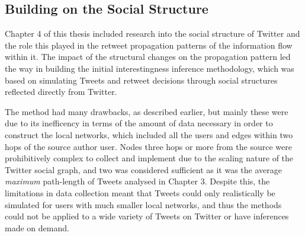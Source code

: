 


\subsection{Building on the Social Structure}
Chapter 4 of this thesis included research into the social structure of Twitter and the role this played in the retweet propagation patterns of the information flow within it. The impact of the structural changes on the propagation pattern led the way in building the initial interestingness inference methodology, which was based on simulating Tweets and retweet decisions through social structures reflected directly from Twitter.

The method had many drawbacks, as described earlier, but mainly these were due to its inefficency in terms of the amount of data necessary in order to construct the local networks, which included all the users and edges within two hops of the source author user. Nodes three hops or more from the source were prohibitively complex to collect and implement due to the scaling nature of the Twitter social graph, and two was considered sufficient as it was the average \textit{maximum} path-length of Tweets analysed in Chapter 3. Despite this, the limitations in data collection meant that Tweets could only realistically be simulated for users with much smaller local networks, and thus the methods could not be applied to a wide variety of Tweets on Twitter or have inferences made on demand.

